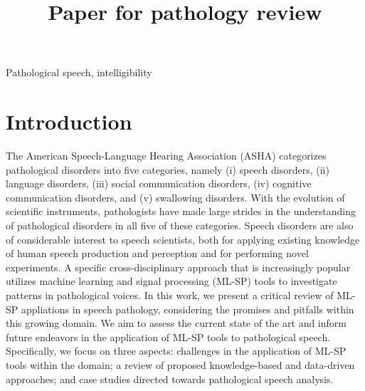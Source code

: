 \documentclass{article}
\title{Paper for pathology review}
\begin{document}
\ninept
%
\maketitle
%
\begin{abstract}
 
\end{abstract}
%
\begin{keywords}
Pathological speech, intelligibility 
\end{keywords}
%
\section{Introduction}
\label{sec:intro}
The American Speech-Language Hearing Association (ASHA) \cite{american2008council} categorizes pathological disorders into five categories, namely (i) speech disorders, (ii) language disorders, (iii) social communication disorders, (iv) cognitive communication disorders, and (v) swallowing disorders. With the evolution of scientific instruments, pathologists have made large strides in the understanding of pathological disorders in all five of these categories. Speech disorders are also of considerable interest to speech scientists, both for applying existing knowledge of human speech production and perception and for performing novel experiments. A specific cross-disciplinary approach that is increasingly popular utilizes machine learning and signal processing (ML-SP) tools to investigate patterns in pathological voices. In this work, we present a critical review of ML-SP appliations in speech pathology, considering the promises and pitfalls within this growing domain. We aim to assess the current state of the art and inform future endeavors in the application of ML-SP tools to pathological speech. Specifically, we focus on three aspects: challenges in the application of ML-SP tools within the domain; a review of proposed knowledge-based and data-driven approaches; and case studies directed towards pathological speech analysis.
\end{document}

